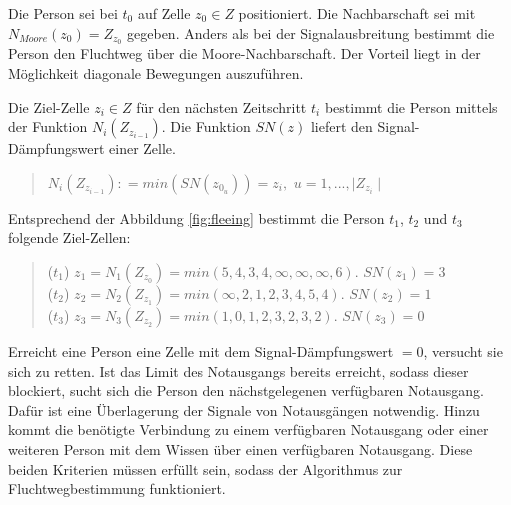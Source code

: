 Die Person sei bei $t_{0}$ auf Zelle $z_{0} \in Z$ positioniert. Die Nachbarschaft sei mit $N_{Moore}(z_{0}) = Z_{z_{0}}$ gegeben. Anders als bei der Signalausbreitung bestimmt die Person den Fluchtweg über die Moore-Nachbarschaft. Der Vorteil liegt in der Möglichkeit diagonale Bewegungen auszuführen.

Die Ziel-Zelle $z_{i} \in Z$ für den nächsten Zeitschritt $t_{i}$  bestimmt die Person mittels der Funktion $N_{i}(Z_{z_{i-1}})$. Die Funktion $SN(z)$ liefert den Signal-Dämpfungswert einer Zelle.

\begin{quote}
$N_{i}(Z_{z_{i-1}}) \mathrel{\mathop:}= min(SN(z_{0_{u}})) = z_{i},$   $u = 1,...,\mid Z_{z_{i}}\mid$
\end{quote}

Entsprechend der Abbildung \ref{fig:fleeing} bestimmt die Person $t_{1}$, $t_{2}$ und $t_{3}$ folgende Ziel-Zellen:

\begin{quote}
($t_{1}$) $z_{1} = N_{1}(Z_{z_{0}}) = min(5,4,3,4, \infty , \infty , \infty , 6)$. $SN(z_{1}) = 3$\\

($t_{2}$) $z_{2} = N_{2}(Z_{z_{1}}) = min(\infty ,2,1,2,3,4,5,4)$. $SN(z_{2}) = 1$\\

($t_{3}$) $z_{3} = N_{3}(Z_{z_{2}}) = min(1,0,1,2,3,2,3,2)$. $SN(z_{3}) = 0$
\end{quote}

Erreicht eine Person eine Zelle mit dem Signal-Dämpfungswert $= 0$, versucht sie sich zu retten. Ist das Limit des Notausgangs bereits erreicht, sodass dieser blockiert, sucht sich die Person den nächstgelegenen verfügbaren Notausgang. Dafür ist eine Überlagerung der Signale von Notausgängen notwendig. Hinzu kommt die benötigte Verbindung zu einem verfügbaren Notausgang oder einer weiteren Person mit dem Wissen über einen verfügbaren Notausgang. Diese beiden Kriterien müssen erfüllt sein, sodass der Algorithmus zur Fluchtwegbestimmung funktioniert.


